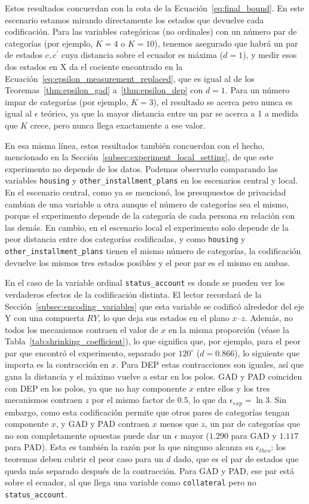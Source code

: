 \documentclass{ieeeaccess}
\begin{document}
Estos resultados concuerdan con la cota de la Ecuación~\eqref{eq:final_bound}. En este escenario estamos mirando directamente los estados que devuelve cada codificación. Para las variables categóricas (no ordinales) con un número par de categorías (por ejemplo, $K=4$ o $K=10$), tenemos asegurado que habrá un par de estados $c, c^{\prime}$ cuya distancia sobre el ecuador es máxima ($d=1$), y medir esos dos estados en X da el cociente encontrado en la Ecuación~\eqref{eq:epsilon_measurement_replaced}, que es igual al de los Teoremas~\ref{thm:epsilon_gad} a~\ref{thm:epsilon_dep} con $d=1$. Para un número impar de categorías (por ejemplo, $K=3$), el resultado se acerca pero nunca es igual al $\epsilon$ teórico, ya que la mayor distancia entre un par se acerca a 1 a medida que $K$ crece, pero nunca llega exactamente a ese valor.

En esa misma línea, estos resultados también concuerdan con el hecho, mencionado en la Sección~\ref{subsec:experiment_local_setting}, de que este experimento no depende de los datos. Podemos observarlo comparando las variables \texttt{housing} y \texttt{other\_installment\_plans} en los escenarios central y local. En el escenario central, como ya se mencionó, los presupuestos de privacidad cambian de una variable a otra aunque el número de categorías sea el mismo, porque el experimento depende de la categoría de cada persona en relación con las demás. En cambio, en el escenario local el experimento solo depende de la peor distancia entre dos categorías codificadas, y como \texttt{housing} y \texttt{other\_installment\_plans} tienen el mismo número de categorías, la codificación devuelve los mismos tres estados posibles y el peor par es el mismo en ambas.

En el caso de la variable ordinal \texttt{status\_account} es donde se pueden ver los verdaderos efectos de la codificación distinta. El lector recordará de la Sección~\ref{subsec:encoding_variables} que esta variable se codificó alrededor del eje Y con una compuerta $RY$, lo que deja sus estados en el plano $x$--$z$. Además, no todos los mecanismos contraen el valor de $x$ en la misma proporción (véase la Tabla~\ref{tab:shrinking_coefficient}), lo que significa que, por ejemplo, para el peor par que encontró el experimento, separado por $120^{\circ}$ ($d=0.866$), lo siguiente que importa es la contracción en $x$. Para DEP estas contracciones son iguales, así que gana la distancia y el máximo vuelve a estar en los polos. GAD y PAD coinciden con DEP en los polos, ya que no hay componente $x$ entre ellos y los tres mecanismos contraen $z$ por el mismo factor de $0.5$, lo que da $\epsilon_{exp} = \ln 3$. Sin embargo, como esta codificación permite que otros pares de categorías tengan componente $x$, y GAD y PAD contraen $x$ menos que $z$, un par de categorías que no son completamente opuestas puede dar un $\epsilon$ mayor ($1.290$ para GAD y $1.117$ para PAD). Esta es también la razón por la que ninguno alcanza su $\epsilon_{theo}$: los teoremas deben cubrir el peor caso para un $d$ dado, que es el par de estados que queda más separado después de la contracción. Para GAD y PAD, ese par está sobre el ecuador, al que llega una variable como \texttt{collateral} pero no \texttt{status\_account}.
\end{document}
